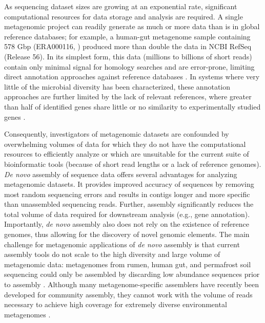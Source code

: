 \documentclass{pnastwo}
\begin{document}
\begin{article}
As sequencing dataset sizes are growing at an exponential
rate, significant computational resources for data storage and
analysis are required. A single metagenomic project can readily generate as much or more data
than is in global reference databases; for example, a human-gut metagenome sample
containing 578 Gbp (ERA000116, \cite{Qin:2010p189}) produced more than double the data in NCBI
RefSeq (Release 56).  In its simplest form, this data (millions to billions of short reads) contain only minimal signal for
homology searches and are error-prone, limiting direct annotation approaches
against reference databases \cite{Wommack:rlm}.  In systems where very little of the microbial diversity has been characterized, 
these annotation approaches are further limited by the lack of relevant references, where greater than half of identified genes share little or no similarity to experimentally studied genes \cite{Arumugam:2011p735,Qin:2010p189}.  

Consequently, investigators of metagenomic datasets are confounded by
overwhelming volumes of data for which they do not have the computational resources
to efficiently analyze or which are unsuitable for the current suite of
bioinformatic tools (because of short read lengths or a lack of reference
genomes). \emph{De novo} assembly of sequence data offers several advantages for
analyzing metagenomic datasets. It provides improved accuracy of sequences by
removing most random sequencing errors and results in contigs longer and more
specific than unassembled sequencing reads. Further, assembly significantly
reduces the total volume of data required for downstream analysis (e.g., gene
annotation). Importantly, \emph{de novo} assembly also does not rely on the
existence of reference genomes, thus allowing for the discovery of novel genomic
elements. The main challenge for metagenomic applications of \emph{de novo}
assembly is that current assembly tools do not scale to the high diversity and
large volume of metagenomic data: metagenomes from rumen, human gut, and
permafrost soil sequencing could only be assembled by discarding low abundance
sequences prior to assembly
\cite{Hess:2011p686,Mackelprang:2011p1087,Qin:2010p189}. Although many
metagenome-specific assemblers have recently been developed for community
assembly, they cannot work with the volume of reads necessary to achieve high
coverage for extremely diverse environmental metagenomes
\cite{metaray, Scholz:2012p1372}.


\end{article}
\end{document}
